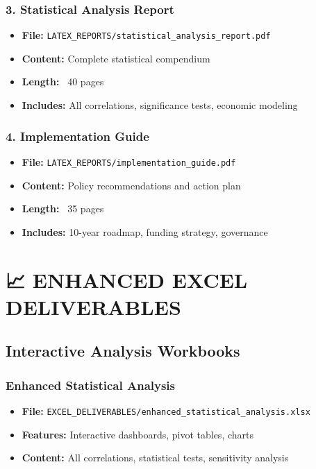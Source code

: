 \documentclass[11pt,letterpaper]{article}
\begin{document}
\subsubsection{3. Statistical Analysis Report}
\begin{itemize}
    \item \textbf{File:} \texttt{LATEX\_REPORTS/statistical\_analysis\_report.pdf}
    \item \textbf{Content:} Complete statistical compendium
    \item \textbf{Length:} ~40 pages
    \item \textbf{Includes:} All correlations, significance tests, economic modeling
\end{itemize}

\subsubsection{4. Implementation Guide}
\begin{itemize}
    \item \textbf{File:} \texttt{LATEX\_REPORTS/implementation\_guide.pdf}
    \item \textbf{Content:} Policy recommendations and action plan
    \item \textbf{Length:} ~35 pages
    \item \textbf{Includes:} 10-year roadmap, funding strategy, governance
\end{itemize}

\section{📈 ENHANCED EXCEL DELIVERABLES}

\subsection{Interactive Analysis Workbooks}

\subsubsection{Enhanced Statistical Analysis}
\begin{itemize}
    \item \textbf{File:} \texttt{EXCEL\_DELIVERABLES/enhanced\_statistical\_analysis.xlsx}
    \item \textbf{Features:} Interactive dashboards, pivot tables, charts
    \item \textbf{Content:} All correlations, statistical tests, sensitivity analysis
\end{itemize}
\end{document}
